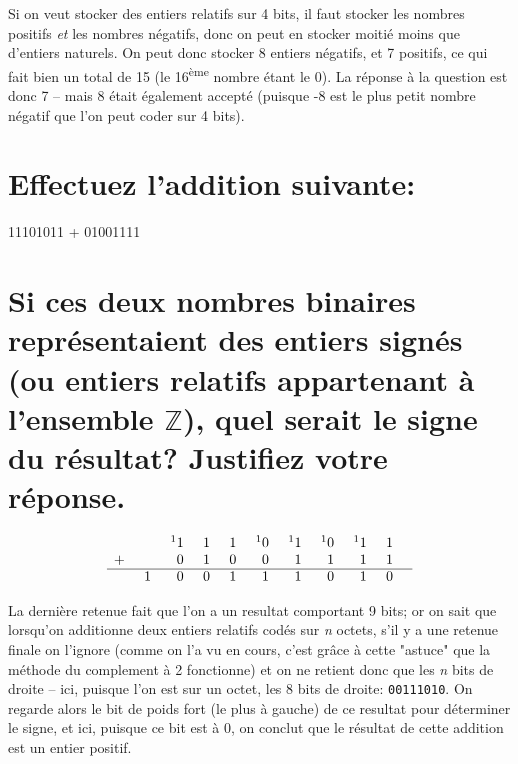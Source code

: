 \documentclass[11pt,a4paper]{exam}
\begin{document}
\begin{questions}
\begin{spacing}{1}
\begin{parts}
				\begin{solution}
					
					Si on veut stocker des entiers relatifs sur 4 bits, il faut stocker les nombres positifs \textit{et} les nombres négatifs, donc on peut en stocker moitié moins que d'entiers naturels. On peut donc stocker 8 entiers négatifs, et 7 positifs, ce qui fait bien un total de 15 (le 16\textsuperscript{ème} nombre étant le 0). La réponse à la question est donc 7 -- mais 8 était également accepté (puisque -8 est le plus petit nombre négatif que l'on peut coder sur 4 bits).
				\end{solution}
			\end{parts}

        \begin{parts}
            	\part[1] {Effectuez l'addition suivante:} 11101011 + 01001111
            	\part[1] {Si ces deux nombres binaires représentaient des entiers signés (ou entiers relatifs appartenant à l'ensemble $\mathbb{Z}$), quel serait le signe du résultat? Justifiez votre réponse.}
       	\end{parts}
        \begin{solution}
	           		\[
	           		\begin{array}{r *{10}{@{\;\;\;\;\;}r}}
	           			&& ^11 & 1 & 1 & ^10 & ^11 & ^10 & ^11 & 1 \\
	           			+ & & 0 & 1 & 0 & 0 & 1 & 1 & 1 & 1 \\
	           			\cline{1-10}
	           			&1 & 0 & 0 & 1 & 1 & 1 & 0 & 1 & 0 \\
	           		\end{array}
	           		\]
	           		
	           		La dernière retenue fait que l'on a un resultat comportant 9 bits; or on sait que lorsqu'on additionne deux entiers relatifs codés sur \textit{n} octets, s'il y a une retenue finale on l'ignore (comme on l'a vu en cours, c'est grâce à cette "astuce" que la méthode du complement à 2 fonctionne) et on ne retient donc que les \textit{n} bits de droite -- ici, puisque l'on est sur un octet, les 8 bits de droite: \texttt{00111010}. On regarde alors le bit de poids fort (le plus à gauche) de ce resultat pour déterminer le signe, et ici, puisque ce bit est à 0, on conclut que le résultat de cette addition est un entier positif.
        \end{solution}
            	

\end{spacing}
\end{questions}
\end{document}
